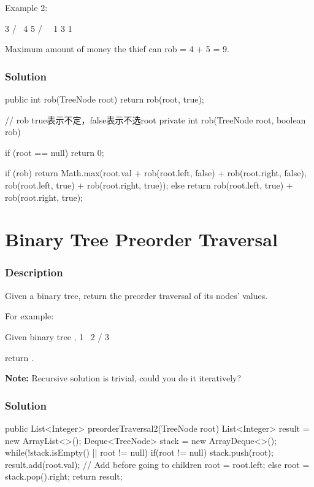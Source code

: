 Example 2:
\begin{Code}
     3
    / \
   4   5
  / \   \
 1   3   1
\end{Code}

Maximum amount of money the thief can rob = 4 + 5 = 9.

\subsubsection{Solution}

\begin{Code}
public int rob(TreeNode root) {
    return rob(root, true);
}

// rob true表示不定，false表示不选root
private int rob(TreeNode root, boolean rob) {
    if (root == null) {
        return 0;
    }

    if (rob) {
        return Math.max(root.val + rob(root.left, false) + rob(root.right, false),
                rob(root.left, true) + rob(root.right, true));
    } else {
        return rob(root.left, true) + rob(root.right, true);
    }
}
\end{Code}

\newpage

\section{Binary Tree Preorder Traversal} %

\subsubsection{Description}
Given a binary tree, return the preorder traversal of its nodes' values.

For example:
\begin{Code}
Given binary tree ,
   1
    \
     2
    /
   3
\end{Code}
return \code{[1,2,3]}.

\textbf{Note:} Recursive solution is trivial, could you do it iteratively?

\subsubsection{Solution}

\begin{Code}
public List<Integer> preorderTraversal2(TreeNode root) {
    List<Integer> result = new ArrayList<>();
    Deque<TreeNode> stack = new ArrayDeque<>();
    while(!stack.isEmpty() || root != null) {
        if(root != null) {
            stack.push(root);
            result.add(root.val);  // Add before going to children
            root = root.left;
        } else {
            root = stack.pop().right;
        }
    }
    return result;
}
\end{Code}

